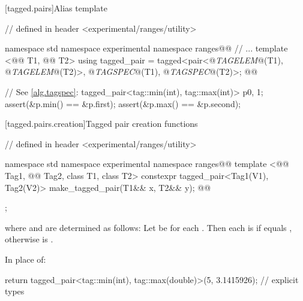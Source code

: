 {[tagged.pairs]{Alias template }

\begin{codeblock}
// defined in header <experimental/ranges/utility>

namespace std { namespace experimental { namespace ranges@@ {
  // ...
  template <@@ T1, @@ T2>
  using tagged_pair = tagged<pair<@\textit{TAGELEM}@(T1), @\textit{TAGELEM}@(T2)>,
                             @\textit{TAGSPEC}@(T1), @\textit{TAGSPEC}@(T2)>;
}}}@\newtxt{\}}@
\end{codeblock}

\pnum {}

\pnum \enterexample
\begin{codeblock}
// See \ref{alg.tagspec}:
tagged_pair<tag::min(int), tag::max(int)> p{0, 1};
assert(&p.min() == &p.first);
assert(&p.max() == &p.second);
\end{codeblock}
\exitexample

[tagged.pairs.creation]{Tagged pair creation functions}

%
\begin{itemdecl}
// defined in header <experimental/ranges/utility>

namespace std { namespace experimental { namespace ranges@@ {
  template <@@ Tag1, @@ Tag2, class T1, class T2>
    constexpr tagged_pair<Tag1(V1), Tag2(V2)> make_tagged_pair(T1&& x, T2&& y);
}}}@\newtxt{\}}@
\end{itemdecl}

\begin{itemdescr}
\pnum
\returns {};

where  and  are determined as follows: Let  be
 for each . Then each  is 
if  equals , otherwise  is
.

\pnum
\enterexample
In place of:

\begin{codeblock}
  return tagged_pair<tag::min(int), tag::max(double)>(5, 3.1415926);   // explicit types
\end{codeblock}


\end{itemdescr}}
